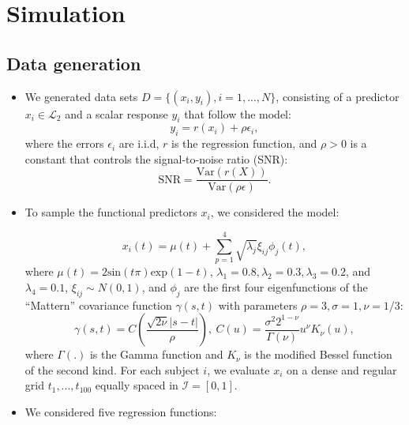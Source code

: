 \documentclass{article}
\begin{document}
\section{Simulation}
\subsection{Data generation}
\begin{itemize}
    \item We generated data sets $D = \{(x_i, y_i), i = 1,..., N\}$, consisting of a predictor $x_i\in\mathcal{L}_2$ and a scalar response $y_i$ that follow the model: 
 \begin{equation} \label{eq:gen}
y_i = r(x_i) + \rho \epsilon_i,
\end{equation}
where the errors $\epsilon_i$ are i.i.d, $r$ is the regression function,  and  $\rho > 0$ is a constant that controls the signal-to-noise ratio (SNR): 
$$\text{SNR} = \frac{\text{Var}(r(X))}{\text{Var}(\rho\epsilon)}.$$
\item To sample the functional predictors $x_i$, we considered the model:

\begin{equation} \label{eq:xmodel}
    x_i(t) = \mu(t) + \sum_{p=1}^4 \sqrt{\lambda_j}\xi_{ij}\phi_j(t),
\end{equation}
where $\mu(t) = 2\text{sin}(t\pi) \text{exp}(1-t)$, $\lambda_1 = 0.8, \lambda_2 = 0.3, \lambda_3 = 0.2$, and $\lambda_4 = 0.1$,  $\xi_{ij}\sim N(0,1) $,  and $\phi_j$ are the first four eigenfunctions of the ``Mattern'' covariance function $\gamma(s,t)$ with parameters $\rho = 3, \sigma = 1, \nu = 1/3$: 
 $$\gamma(s,t) = C\left(\frac{\sqrt{2\nu}|s-t|}{\rho}\right), \ C(u) = \frac{\sigma^2 2^{1-\nu}}{\Gamma(\nu)} u^{\nu} K_{\nu}(u),$$
  where $\Gamma(.)$ is the Gamma function and $K_{\nu}$ is the modified Bessel function of the second kind. For each subject $i$, we evaluate $x_i$ on a dense and regular grid $t_1,..., t_{100}$ equally spaced in $\mathcal{I} = [0,1]$. 
\item We considered five regression functions:
\begin{itemize}


\end{itemize}
\end{itemize}
\end{document}
